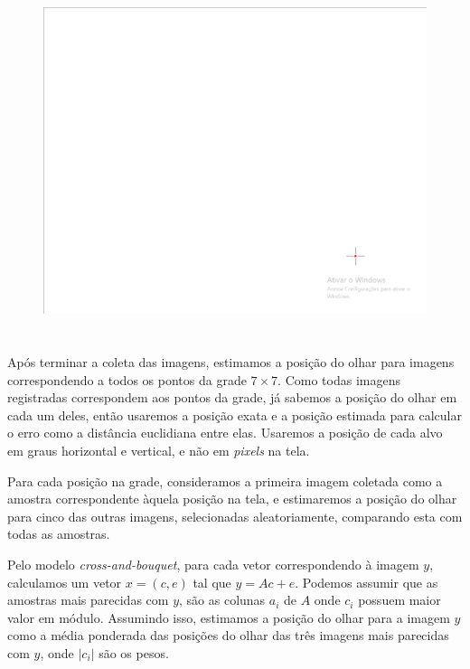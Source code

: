 \begin{figure}
\centering
\includegraphics[scale=1]{imagens/alvo.png}
\caption{ }
\label{fig:alvo}
\end{figure}

\section{}

Após terminar a coleta das imagens, estimamos a posição do olhar para imagens correspondendo a todos os pontos da grade $7 \times 7$. Como todas imagens registradas correspondem aos pontos da grade, já sabemos a posição do olhar em cada um deles, então usaremos a posição exata e a posição estimada para calcular o erro como a distância euclidiana entre elas. Usaremos a posição de cada alvo em graus horizontal e vertical, e não em \textit{pixels} na tela.

Para cada posição na grade, consideramos a primeira imagem coletada como a amostra correspondente àquela posição na tela, e estimaremos a posição do olhar para cinco das outras imagens, selecionadas aleatoriamente, comparando esta com todas as amostras.

Pelo modelo \textit{cross-and-bouquet}, para cada vetor correspondendo à imagem $y$, calculamos um vetor $x = (c, e)$ tal que $y = Ac + e$. Podemos assumir que as amostras mais parecidas com $y$, são as colunas $a_i$ de $A$ onde $c_i$ possuem maior valor em módulo. Assumindo isso, estimamos a posição do olhar para a imagem $y$ como a média ponderada das posições do olhar das três imagens mais parecidas com $y$, onde $\vert c_i \vert$ são os pesos.

